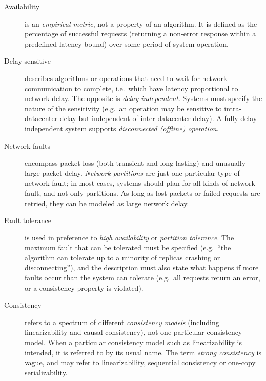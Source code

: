 \documentclass[a4paper,twocolumn,10pt]{article}
\begin{document}
\begin{description}
\item[Availability] is an \emph{empirical metric}, not a property of an algorithm. It is defined as
    the percentage of successful requests (returning a non-error response within a predefined
    latency bound) over some period of system operation.
\item[Delay-sensitive] describes algorithms or operations that need to wait for network
    communication to complete, i.e.\ which have latency proportional to network delay. The opposite
    is \emph{delay-independent}. Systems must specify the nature of the sensitivity (e.g.\ an
    operation may be sensitive to intra-datacenter delay but independent of inter-datacenter delay).
    A fully delay-independent system supports \emph{disconnected (offline) operation}.
\item[Network faults] encompass packet loss (both transient and long-lasting) and unusually large
    packet delay. \emph{Network partitions} are just one particular type of network fault; in most
    cases, systems should plan for all kinds of network fault, and not only partitions. As long as
    lost packets or failed requests are retried, they can be modeled as large network delay.
\item[Fault tolerance] is used in preference to \emph{high availability} or \emph{partition
    tolerance}. The maximum fault that can be tolerated must be specified (e.g.\ ``the algorithm can
    tolerate up to a minority of replicas crashing or disconnecting''), and the description must
    also state what happens if more faults occur than the system can tolerate (e.g.\ all requests
    return an error, or a consistency property is violated).
\item[Consistency] refers to a spectrum of different \emph{consistency models} (including
    linearizability and causal consistency), not one particular consistency model. When a particular
    consistency model such as linearizability is intended, it is referred to by its usual name. The
    term \emph{strong consistency} is vague, and may refer to linearizability, sequential
    consistency or one-copy serializability.
\end{description}

\end{document}
